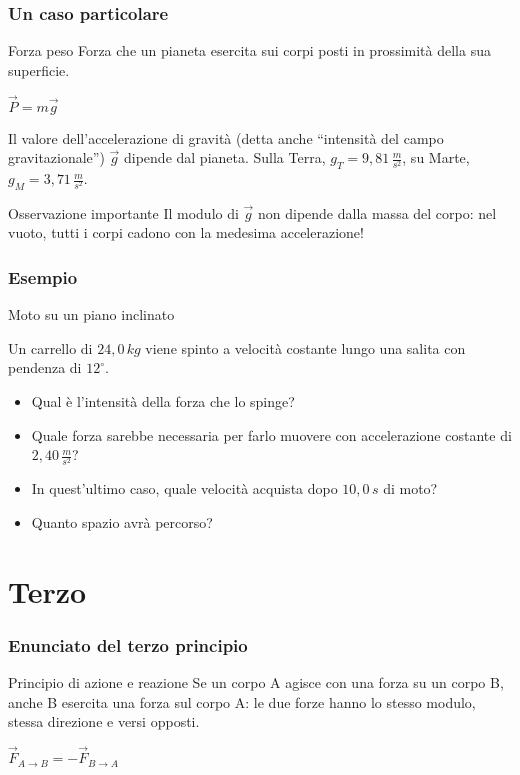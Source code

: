 \documentclass[]{beamer}
\theoremstyle{plain}
\begin{document}
\begin{frame}
  \frametitle{Un caso particolare}
\begin{block}{Forza peso}
Forza che un pianeta esercita sui corpi posti in prossimità della sua superficie.\pause
\begin{center}
\colorbox{blue!30}{$ \vec{P} = m \vec{g} $}
\end{center}\pause
Il valore dell'accelerazione di gravità (detta anche ``intensità del campo gravitazionale'') $ \vec{g} $ dipende dal pianeta. Sulla Terra, $ g_T = 9,81 \, \frac{m}{s^2} $, su Marte, $ g_M = 3,71 \, \frac{m}{s^2} $.
\end{block}\pause
\begin{alertblock}{Osservazione importante}
  Il modulo di $ \vec{g} $ non dipende dalla massa del corpo: nel vuoto, tutti i corpi cadono con la medesima accelerazione! \href{video/Piumapalla.mp4}{}
\end{alertblock}
\end{frame}



\begin{frame}
\frametitle{Esempio}
\begin{exampleblock}{Moto su un piano inclinato}
{\small Un carrello di $ 24,0 \, kg $ viene spinto a velocità costante lungo una salita con pendenza di $ 12^\circ $.
\begin{itemize}
  \item Qual è l'intensità della forza che lo spinge?
  \item Quale forza sarebbe necessaria per farlo muovere con accelerazione costante di  $ 2,40 \, \frac{m}{s^2} $?
  \item In quest'ultimo caso, quale velocità acquista dopo $ 10,0 \, s $ di moto?
  \item Quanto spazio avrà percorso?
\end{itemize}
}
\end{exampleblock}
\end{frame}



\section{Terzo}

\begin{frame}
  \frametitle{Enunciato del terzo principio}
\begin{block}{Principio di azione e reazione}
Se un corpo A agisce con una forza su un corpo B, anche B esercita una forza sul corpo A: le due forze hanno lo stesso modulo, stessa direzione e versi opposti.\pause
\begin{center}
\colorbox{blue!30}{$ \vec{F}_{A \rightarrow B} = - \vec{F}_{B \rightarrow A} $}
\end{center}
\end{block}
\end{frame}
\end{document}

